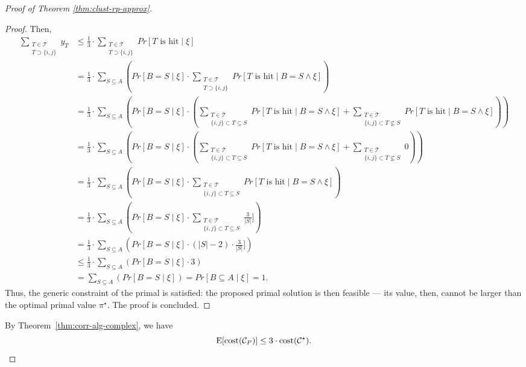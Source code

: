 \begin{proof}[Proof of Theorem \ref{thm:clust-rp-approx}]
\begin{proof}
    Then,
    \begin{align*}
        \sum_{\substack{T \in \mathcal{T}\\T \supset \{i,j\}}} y_T &\le \frac13 \cdot \sum_{\substack{T \in \mathcal{T}\\T \supset \{i,j\}}}  Pr[T \text{ is hit} \mid \xi]\\
        &=\frac13 \cdot \sum_{S \subseteq A} \left(Pr\left[B = S \mid \xi\right] \cdot \sum_{\substack{T \in \mathcal{T}\\T \supset \{i,j\}}}  Pr[T \text{ is hit} \mid B = S \wedge \xi]\right)\\
        &=\frac13 \cdot \sum_{S \subseteq A} \left(Pr\left[B = S \mid \xi\right] \cdot \left(\sum_{\substack{T \in \mathcal{T}\\ \{i,j\} \subset T  \subseteq S}}  Pr[T \text{ is hit} \mid B = S \wedge \xi] + \sum_{\substack{T \in \mathcal{T}\\ \{i,j\} \subset T  \not\subseteq S}}  Pr[T \text{ is hit} \mid B = S \wedge \xi]\right)\right)\\
        &=\frac13 \cdot \sum_{S \subseteq A} \left(Pr\left[B = S \mid \xi\right] \cdot \left(\sum_{\substack{T \in \mathcal{T}\\ \{i,j\} \subset T  \subseteq S}}  Pr[T \text{ is hit} \mid B = S \wedge \xi] + \sum_{\substack{T \in \mathcal{T}\\ \{i,j\} \subset T  \not\subseteq S}}  0\right)\right)\\
        &=\frac13 \cdot \sum_{S \subseteq A} \left(Pr\left[B = S \mid \xi\right] \cdot \sum_{\substack{T \in \mathcal{T}\\ \{i,j\} \subset T  \subseteq S}}  Pr[T \text{ is hit} \mid B = S \wedge \xi] \right)\\
        &=\frac13 \cdot \sum_{S \subseteq A} \left(Pr\left[B = S \mid \xi\right] \cdot \sum_{\substack{T \in \mathcal{T}\\ \{i,j\} \subset T  \subseteq S}}  \frac3{|S|}] \right)\\
        &=\frac13 \cdot \sum_{S \subseteq A} \left(Pr\left[B = S \mid \xi\right] \cdot (|S| -2) \cdot  \frac3{|S|}] \right)\\
        &\le\frac13 \cdot \sum_{S \subseteq A} \left(Pr\left[B = S \mid \xi\right] \cdot 3 \right)\\
        &=\sum_{S \subseteq A} \left(Pr\left[B = S \mid \xi\right] \right) = Pr\left[B \subseteq A\mid \xi\right]= 1.
    \end{align*}
    Thus, the generic constraint of the primal is satisfied: the proposed primal solution is then feasible --- its value, then, cannot be larger than the optimal primal value $\pi^\star$. The proof is concluded.
\end{proof}

%
By Theorem~\ref{thm:corr-alg-complex}, we have
$$\text{E}[\text{cost}(\mathcal{C}_P)] \le 3 \cdot \text{cost}(\mathcal{C}^{\star}).\qedhere$$
\end{proof}





